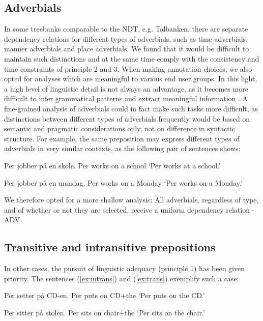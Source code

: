 \documentclass[10pt,a4paper]{article}
\begin{document}
\subsection{Adverbials}
In some treebanks comparable to the NDT, e.g. Talbanken, there are
separate dependency relations for different types of adverbials, such
as time adverbials, manner adverbials and place adverbials.  We found
that it would be difficult to maintain such distinctions and at the
same time comply with the consistency and time constraints of
principle 2 and 3.  When making annotation choices, we also opted for
analyses which are meaningful to various end user groups.  In this
light, a high level of linguistic detail is not always an advantage,
as it becomes more difficult to infer grammatical patterns and extract
meaningful information \cite{Mar:Man:08}.  A fine-grained analysis of
adverbials could in fact make such tasks more difficult, as
distinctions between different types of adverbials frequently would be
based on semantic and pragmatic considerations only, not on difference
in syntactic structure.  For example, the same preposition may express
different types of adverbials in very similar contexts, as the
following pair of sentences shows:

\begin{examples}
\item\label{ex:locadv}
\gll Per jobber på en skole.
Per works on a school
\glt `Per works at a school.'
\glend

\item\label{ex:timeadv}
\gll Per jobber på en mandag.
Per works on a Monday
\glt `Per works on a Monday.'
\glend
\end{examples}

We therefore opted for a more shallow analysis:
All adverbials, regardless of type,
and of whether or not they are selected,
receive a uniform dependency relation - ADV. 

\subsection{Transitive and intransitive prepositions}\label{prep}
In other cases, the pursuit of linguistic adequacy (principle 1) has been given priority. The sentences (\ref{ex:intrans}) and (\ref{ex:trans}) exemplify such a case:

\begin{examples}
\item\label{ex:intrans}
\gll Per setter på CD-en.
Per puts on CD+the
\glt `Per puts on the CD.'
\glend

\item\label{ex:trans}
\gll Per sitter på stolen.
Per sits on chair+the
\glt `Per sits on the chair.'
\glend
\end{examples}
\end{document}
